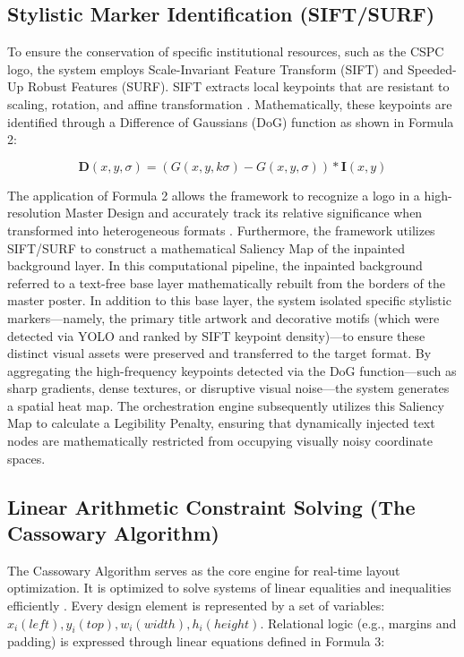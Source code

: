 \begin{refsection}
\subsection{Stylistic Marker Identification (SIFT/SURF)}
To ensure the conservation of specific institutional resources, such as the CSPC logo, the system employs Scale-Invariant Feature Transform (SIFT) and Speeded-Up Robust Features (SURF). SIFT extracts local keypoints that are resistant to scaling, rotation, and affine transformation \cite{Shaharom2023SIFT}. Mathematically, these keypoints are identified through a Difference of Gaussians (DoG) function as shown in Formula 2:

\begin{center}
\begin{minipage}{0.8\textwidth}
\begin{equation}
\mathbf{D}(x,y,\sigma)=(G(x,y,k\sigma)-G(x,y,\sigma))\ast \mathbf{I}(x,y)
\end{equation}
\centering
\end{minipage}
\end{center}

The application of Formula 2 allows the framework to recognize a logo in a high-resolution Master Design and accurately track its relative significance when transformed into heterogeneous formats \cite{Shaharom2023SIFT}. Furthermore, the framework utilizes SIFT/SURF to construct a mathematical Saliency Map of the inpainted background layer. In this computational pipeline, the inpainted background referred to a text-free base layer mathematically rebuilt from the borders of the master poster. In addition to this base layer, the system isolated specific stylistic markers—namely, the primary title artwork and decorative motifs (which were detected via YOLO and ranked by SIFT keypoint density)—to ensure these distinct visual assets were preserved and transferred to the target format. By aggregating the high-frequency keypoints detected via the DoG function---such as sharp gradients, dense textures, or disruptive visual noise---the system generates a spatial heat map. The orchestration engine subsequently utilizes this Saliency Map to calculate a Legibility Penalty, ensuring that dynamically injected text nodes are mathematically restricted from occupying visually noisy coordinate spaces.

\subsection{Linear Arithmetic Constraint Solving (The Cassowary Algorithm)}
The Cassowary Algorithm serves as the core engine for real-time layout optimization. It is optimized to solve systems of linear equalities and inequalities efficiently \cite{Jiang2020ORCSolver}. Every design element is represented by a set of variables: $x_i\left(left\right),y_i\left(top\right),w_i\left(width\right),h_i\left(height\right).$ Relational logic (e.g., margins and padding) is expressed through linear equations defined in Formula 3:


\end{refsection}
